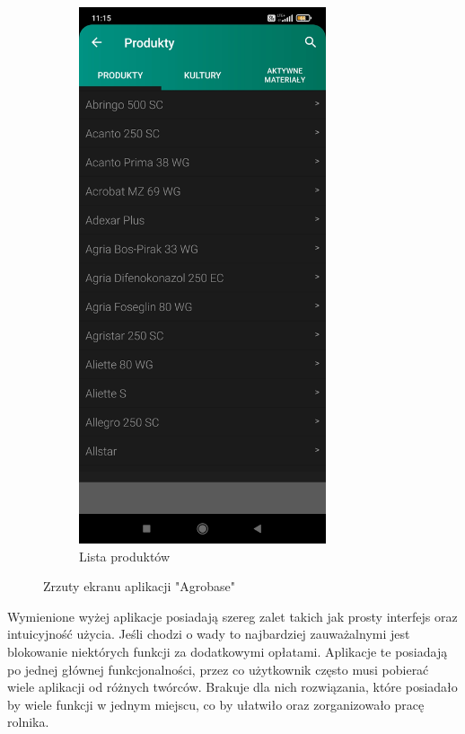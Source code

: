 \documentclass[a4paper,12pt,oneside]{book}
\begin{document}
\begin{figure}[H]
\begin{subfigure}{.5\textwidth}
			\includegraphics[width=0.8\textwidth]{grafika/db_2.jpg}
			\caption{Lista produktów}
		\end{subfigure}
		\caption{Zrzuty ekranu aplikacji "Agrobase"}
	\end{figure}

	Wymienione wyżej aplikacje posiadają szereg zalet takich jak prosty interfejs oraz intuicyjność użycia. Jeśli chodzi o wady to najbardziej zauważalnymi jest blokowanie niektórych funkcji za dodatkowymi opłatami. Aplikacje te posiadają po jednej głównej funkcjonalności, przez co użytkownik często musi pobierać wiele aplikacji od różnych twórców. Brakuje dla nich rozwiązania, które posiadało by wiele funkcji w jednym miejscu, co by ułatwiło oraz zorganizowało pracę rolnika.
	
\end{document}
